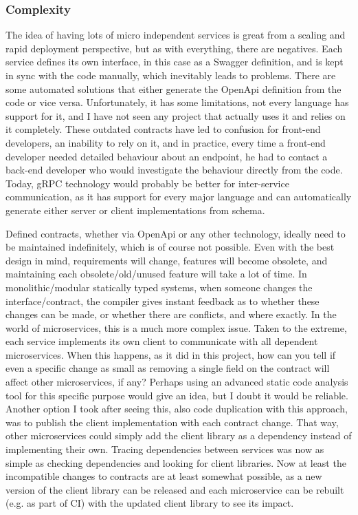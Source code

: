 \subsubsection{Complexity}
The idea of having lots of micro independent services is great from a scaling and rapid deployment perspective, but as with everything, there are negatives. Each service defines its own interface, in this case as a Swagger definition, and is kept in sync with the code manually, which inevitably leads to problems. There are some automated solutions that either generate the OpenApi definition from the code or vice versa. Unfortunately, it has some limitations, not every language has support for it, and I have not seen any project that actually uses it and relies on it completely. These outdated contracts have led to confusion for front-end developers, an inability to rely on it, and in practice, every time a front-end developer needed detailed behaviour about an endpoint, he had to contact a back-end developer who would investigate the behaviour directly from the code. Today, gRPC technology would probably be better for inter-service communication, as it has support for every major language and can automatically generate either server or client implementations from schema.

Defined contracts, whether via OpenApi or any other technology, ideally need to be maintained indefinitely, which is of course not possible. Even with the best design in mind, requirements will change, features will become obsolete, and maintaining each obsolete/old/unused feature will take a lot of time. In monolithic/modular statically typed systems, when someone changes the interface/contract, the compiler gives instant feedback as to whether these changes can be made, or whether there are conflicts, and where exactly. In the world of microservices, this is a much more complex issue. Taken to the extreme, each service implements its own client to communicate with all dependent microservices. When this happens, as it did in this project, how can you tell if even a specific change as small as removing a single field on the contract will affect other microservices, if any? Perhaps using an advanced static code analysis tool for this specific purpose would give an idea, but I doubt it would be reliable. Another option I took after seeing this, also code duplication with this approach, was to publish the client implementation with each contract change. That way, other microservices could simply add the client library as a dependency instead of implementing their own. Tracing dependencies between services was now as simple as checking dependencies and looking for client libraries. Now at least the incompatible changes to contracts are at least somewhat possible, as a new version of the client library can be released and each microservice can be rebuilt (e.g. as part of CI) with the updated client library to see its impact.

